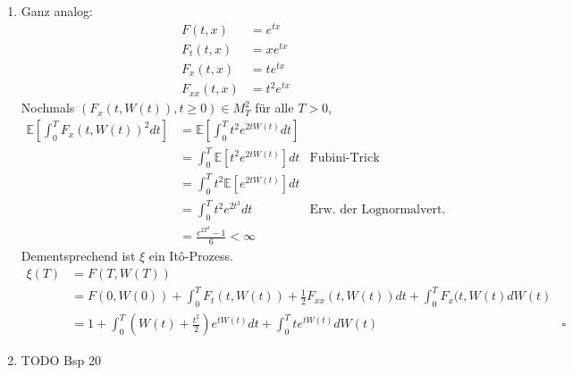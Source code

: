 \documentclass[a4paper,11pt,notitlepage,fullpage]{article}
\newcommand{\Ee}[1]{\mathbb E\left[#1\right]}
\begin{document}
\begin{enumerate}
\item Ganz analog:
\begin{align*}
F(t, x) &= e^{tx} \\
F_t(t, x) &= x e^{tx} \\
F_x(t, x) &= t e^{tx} \\
F_{xx}(t, x) &= t^2 e^{tx}
\end{align*}
Nochmals $(F_x(t, W(t)), t \geq 0) \in M_T^2$ für alle $T > 0$, 
\begin{align*}
\Ee{ \int_0^T F_x(t, W(t))^2 dt} &= \Ee{ \int_0^T t^2 e^{2tW(t)} dt} \\
&= \int_0^T \Ee{ t^2 e^{2tW(t)}} dt &\text{Fubini-Trick} \\
&= \int_0^T  t^2 \Ee{ e^{2tW(t)}} dt \\
&= \int_0^T  t^2 e^{2t^3} dt &\text{Erw. der Lognormalvert.}\\
&= \frac{e^{2T^3} - 1}{6} < \infty
\end{align*}
Dementsprechend ist $\xi$ ein Itô-Prozess.
\begin{align*}
\xi(T) &= F(T, W(T)) \\
&= F(0, W(0)) + \int_0^T F_t(t, W(t)) + \frac{1}{2} F_{xx}(t, W(t)) dt + \int_0^T F_x(t, W(t) dW(t) \\
&= 1 + \int_0^T (W(t) + \frac{t^2}{2}) e^{tW(t)} dt + \int_0^T t e^{tW(t)} dW(t)&\square
\end{align*}

\item TODO Bsp 20


\end{enumerate}
\end{document}

